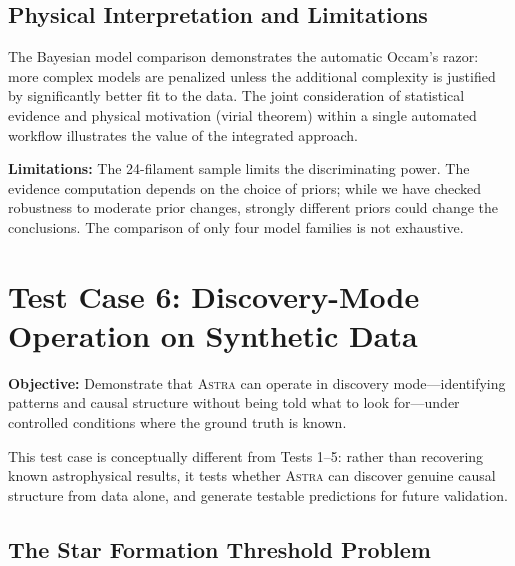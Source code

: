 \documentclass[usenatbib]{rasti}
\newcommand{\astra}{\textsc{Astra}\xspace}
\begin{document}
\subsection{Physical Interpretation and Limitations}
\label{sec:tc5:interpretation}

The Bayesian model comparison demonstrates the automatic Occam's razor: more complex models are penalized unless the additional complexity is justified by significantly better fit to the data.
The joint consideration of statistical evidence and physical motivation (virial theorem) within a single automated workflow illustrates the value of the integrated approach.

\textbf{Limitations:}
The 24-filament sample limits the discriminating power.
The evidence computation depends on the choice of priors; while we have checked robustness to moderate prior changes, strongly different priors could change the conclusions.
The comparison of only four model families is not exhaustive.

\section{Test Case 6: Discovery-Mode Operation on Synthetic Data}
\label{sec:tc6}

\textbf{Objective:} Demonstrate that \astra can operate in discovery mode---identifying patterns and causal structure without being told what to look for---under controlled conditions where the ground truth is known.

This test case is conceptually different from Tests 1--5: rather than recovering known astrophysical results, it tests whether \astra can discover genuine causal structure from data alone, and generate testable predictions for future validation.

\subsection{The Star Formation Threshold Problem}
\label{sec:tc6:problem}
\end{document}
